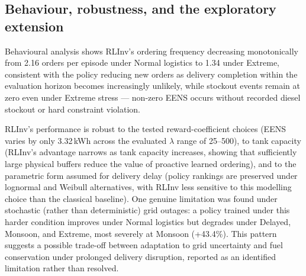 
\subsection{Behaviour, robustness, and the exploratory extension}

Behavioural analysis shows RLInv's ordering frequency decreasing
monotonically from 2.16 orders per episode under Normal logistics to
1.34 under Extreme, consistent with the policy reducing new orders as
delivery completion within the evaluation horizon becomes increasingly
unlikely, while stockout events remain at zero even under Extreme
stress --- non-zero EENS occurs without recorded diesel stockout or
hard constraint violation. 


RLInv's performance is robust to the tested reward-coefficient choices
(EENS varies by only 3.32\,kWh across the evaluated $\lambda$ range of
25--500), to tank capacity (RLInv's advantage narrows as tank capacity
increases, showing that sufficiently large physical buffers reduce the
value of proactive learned ordering), and to the parametric form
assumed for delivery delay (policy rankings are preserved under
lognormal and Weibull alternatives, with RLInv less sensitive to this
modelling choice than the classical baseline). One genuine limitation
was found under stochastic (rather than deterministic) grid outages: a
policy trained under this harder condition improves under Normal
logistics but degrades under Delayed, Monsoon, and Extreme, most
severely at Monsoon (+43.4\%). This pattern suggests a possible
trade-off between adaptation to grid uncertainty and fuel conservation
under prolonged delivery
disruption, reported as an identified limitation rather than resolved.


